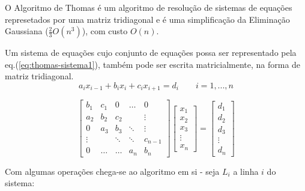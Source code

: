O Algoritmo de Thomas é um algoritmo de resolução de sistemas de equações represetados por uma matriz tridiagonal e é uma simplificação da Eliminação Gaussiana ($\frac{2}{3}O(n^3)$), com custo $O(n)$.

Um sistema de equações cujo conjunto de equações possa ser representado pela eq.(\ref{eq:thomas-sistema1}), também pode ser escrita matricialmente, na forma de matriz tridiagonal.
\begin{equation}
\label{eq:thomas-sistema1}
a_i x_{i-1} + b_i x_i + c_i x_{i+1} = d_i \qquad i = 1, ..., n
\end{equation}

\begin{equation*}
	\begin{bmatrix}
		b_1 & c_1 &     0   &  \ldots     & 0\\
		a_2 & b_2 &   c_2   &        &   \vdots\\
		 0  & a_3 &   b_3   & \ddots & \vdots \\
	\vdots  &     &  \ddots & \ddots & c_{n-1} \\
	     0  & \ldots & \ldots &  a_n   & b_n 
	\end{bmatrix}
	\begin{bmatrix}
		x_1 \\
		x_2 \\
		x_3 \\
		\vdots \\
		x_n
	\end{bmatrix}
	=\begin{bmatrix}
		d_1 \\
		d_2 \\
		d_3 \\
		\vdots \\
		d_n
	\end{bmatrix}
\end{equation*}

Com algumas operações chega-se ao algoritmo em si - seja $L_i$ a linha $i$ do sistema:

